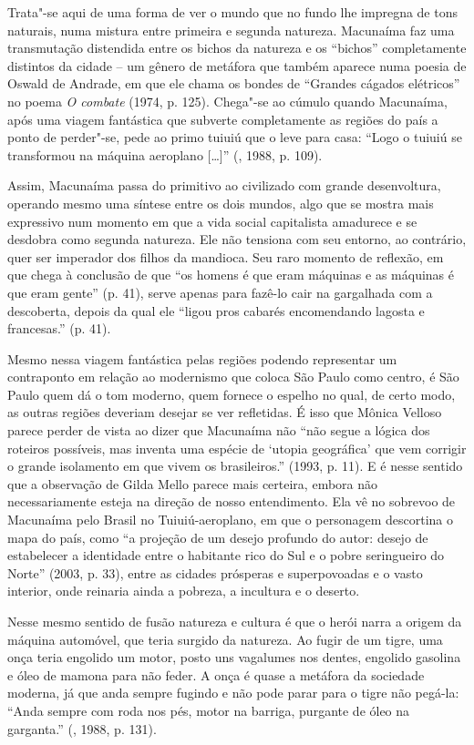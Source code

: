 {Trata"-se aqui de uma forma de ver o mundo que no fundo lhe impregna de
tons naturais, numa mistura entre primeira e segunda natureza. Macunaíma
faz uma transmutação distendida entre os bichos da natureza e os
``bichos'' completamente distintos da cidade -- um gênero de metáfora
que também aparece numa poesia de Oswald de Andrade, em que ele chama os
bondes de ``Grandes cágados elétricos'' no poema \emph{O combate} (1974,
p. 125). Chega"-se ao cúmulo quando Macunaíma, após uma viagem fantástica
que subverte completamente as regiões do país a ponto de perder"-se, pede
ao primo tuiuiú que o leve para casa: ``Logo o tuiuiú se transformou na
máquina aeroplano [\ldots{}]'' (, 1988, p. 109).

Assim, Macunaíma passa do primitivo ao civilizado com grande
desenvoltura, operando mesmo uma síntese entre os dois mundos, algo que
se mostra mais expressivo num momento em que a vida social capitalista
amadurece e se desdobra como segunda natureza. Ele não tensiona com seu
entorno, ao contrário, quer ser imperador dos filhos da mandioca. Seu
raro momento de reflexão, em que chega à conclusão de que ``os homens é
que eram máquinas e as máquinas é que eram gente'' (p. 41), serve apenas
para fazê-lo cair na gargalhada com a descoberta, depois da qual ele
``ligou pros cabarés encomendando lagosta e francesas.'' (p. 41).

Mesmo nessa viagem fantástica pelas regiões podendo representar um
contraponto em relação ao modernismo que coloca São Paulo como centro, é
São Paulo quem dá o tom moderno, quem fornece o espelho no qual, de
certo modo, as outras regiões deveriam desejar se ver refletidas. É isso
que Mônica Velloso parece perder de vista ao dizer que Macunaíma não
``não segue a lógica dos roteiros possíveis, mas inventa uma espécie de
`utopia geográfica' que vem corrigir o grande isolamento em que vivem os
brasileiros.'' (1993, p. 11). E é nesse sentido que a observação de
Gilda Mello parece mais certeira, embora não necessariamente esteja na
direção de nosso entendimento. Ela vê no sobrevoo de Macunaíma pelo
Brasil no Tuiuiú-aeroplano, em que o personagem descortina o mapa do
país, como ``a projeção de um desejo profundo do autor: desejo de
estabelecer a identidade entre o habitante rico do Sul e o pobre
seringueiro do Norte'' (2003, p. 33), entre as cidades prósperas e
superpovoadas e o vasto interior, onde reinaria ainda a pobreza, a
incultura e o deserto.

Nesse mesmo sentido de fusão natureza e cultura é que o herói narra a
origem da máquina automóvel, que teria surgido da natureza. Ao fugir de
um tigre, uma onça teria engolido um motor, posto uns vagalumes nos
dentes, engolido gasolina e óleo de mamona para não feder. A onça é
quase a metáfora da sociedade moderna, já que anda sempre fugindo e não
pode parar para o tigre não pegá-la: ``Anda sempre com roda nos pés,
motor na barriga, purgante de óleo na garganta.'' (, 1988, p.
131).

}
